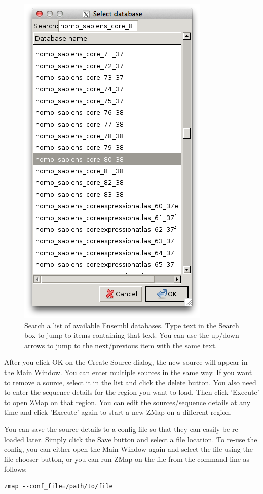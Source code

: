 \documentclass[letterpaper]{article}
\begin{document}
\begin{figure}
\centering
\color[rgb]{0.30980393,0.5058824,0.7411765}
\includegraphics[resolution=150]{img_create_source_ensembl_search_db.png}
\caption{Search a list of available Ensembl databases. Type text in the Search box to jump to items containing that text. You can use the up/down arrows to jump to the next/previous item with the same text.}
\label{img_create_source_ensembl_search_db}
\end{figure}

After you click OK on the Create Source dialog, the new source will appear in the Main Window. You can enter multiple sources in the same way. If you want to remove a source, select it in the list and click the delete button. You also need to enter the sequence details for the region you want to load. Then click 'Execute' to open ZMap on that region. You can edit the sources/sequence details at any time and click 'Execute' again to start a new ZMap on a different region.

You can save the source details to a config file so that they can easily be re-loaded later. Simply click the Save button and select a file location. To re-use the config, you can either open the Main Window again and select the file using the file chooser button, or you can run ZMap on the file from the command-line as follows:
\begin{lstlisting}
zmap --conf_file=/path/to/file
\end{lstlisting}
\end{document}
